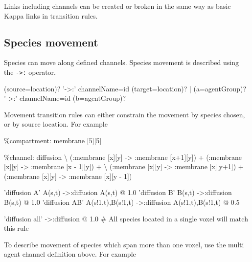 Links including channels can be created or broken in the same way as basic Kappa links in transition rules.

\subsection{Species movement}

Species can move along defined channels. Species movement is described using the \verb|->:| operator.
\begin{bnfsource}
(source=location)? '->:' channelName=id (target=location)?
| (a=agentGroup)? '->:' channelName=id (b=agentGroup)?
\end{bnfsource}

Movement transition rules can either constrain the movement by species chosen, or by source location. For example

\begin{kappasource}
\%compartment: membrane [5][5]

\%channel: diffusion {\textbackslash}
    (:membrane [x][y] -> :membrane [x+1][y]) + (:membrane [x][y] -> :membrane [x - 1][y]) + {\textbackslash}
    (:membrane [x][y] -> :membrane [x][y+1]) + (:membrane [x][y] -> :membrane [x][y - 1])

'diffusion A' A(s,t) ->:diffusion A(s,t) @ 1.0
'diffusion B' B(s,t) ->:diffusion B(s,t) @ 1.0
'diffusion AB' A(s!1,t),B(s!1,t) ->:diffusion A(s!1,t),B(s!1,t) @ 0.5

'diffusion all' ->:diffusion @ 1.0 # All species located in a single voxel will match this rule
\end{kappasource}

To describe movement of species which span more than one voxel, use the multi agent channel definition above. For example

